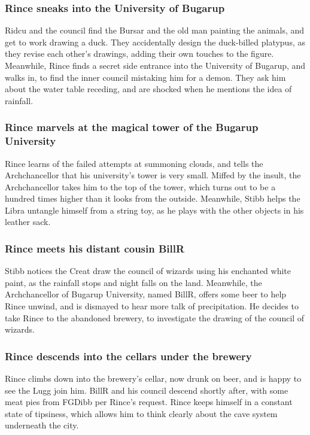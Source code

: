 \subsubsection{\Gls{Rince} sneaks into the University of Bugarup}
\Gls{Ridcu} and the council find the \Gls{Bursar} and the old man painting the animals, and get to
work drawing a duck. They accidentally design the duck-billed platypus, as they revise each other's
drawings, adding their own touches to the figure. Meanwhile, \Gls{Rince} finds a secret side
entrance into the University of Bugarup, and walks in, to find the inner council mistaking him for
a demon. They ask him about the water table receding, and are shocked when he mentions the idea of
rainfall.

\subsubsection{\Gls{Rince} marvels at the magical tower of the Bugarup University}
\Gls{Rince} learns of the failed attempts at summoning clouds, and tells the Archchancellor that
his university's tower is very small. Miffed by the insult, the Archchancellor takes him to the
top of the tower, which turns out to be a hundred times higher than it looks from the outside.
Meanwhile, \Gls{Stibb} helps the \Gls{Libra} untangle himself from a string toy, as he plays with
the other objects in his leather sack.

\subsubsection{\Gls{Rince} meets his distant cousin \Gls{BillR}}
\Gls{Stibb} notices the \Gls{Creat} draw the council of wizards using his enchanted white paint, as
the rainfall stops and night falls on the land. Meanwhile, the Archchancellor of Bugarup University,
named \Gls{BillR}, offers some beer to help \Gls{Rince} unwind, and is dismayed to hear more talk 
of precipitation. He decides to take \Gls{Rince} to the abandoned brewery, to investigate the
drawing of the council of wizards.

\subsubsection{\Gls{Rince} descends into the cellars under the brewery}
\Gls{Rince} climbs down into the brewery's cellar, now drunk on beer, and is happy to see the 
\Gls{Lugg} join him. \Gls{BillR} and his council descend shortly after, with some meat pies from 
\Gls{FGDibb} per \Gls{Rince}'s request. \Gls{Rince} keeps himself in a constant state of tipsiness,
which allows him to think clearly about the cave system underneath the city.

